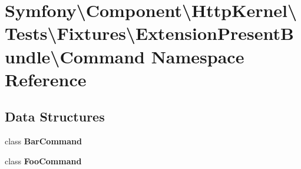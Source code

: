 \section{Symfony\textbackslash{}Component\textbackslash{}Http\+Kernel\textbackslash{}Tests\textbackslash{}Fixtures\textbackslash{}Extension\+Present\+Bundle\textbackslash{}Command Namespace Reference}
\label{namespace_symfony_1_1_component_1_1_http_kernel_1_1_tests_1_1_fixtures_1_1_extension_present_bundle_1_1_command}
\subsection*{Data Structures}
\begin{DoxyCompactItemize}
\item 
class {\bf Bar\+Command}
\item 
class {\bf Foo\+Command}
\end{DoxyCompactItemize}

